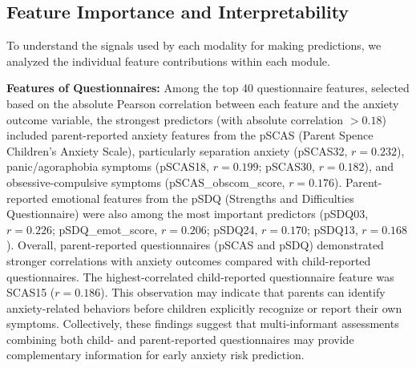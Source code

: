 \documentclass[10pt,letterpaper]{article}
\begin{document}
                                                                                                          \subsection*{Feature Importance and Interpretability}

                                                                                                                          To understand the signals used by each modality for making predictions, we analyzed the individual feature contributions within each module.

\textbf{Features of Questionnaires:} Among the top 40 questionnaire features, selected based on the absolute Pearson correlation between each feature and the anxiety outcome variable, the strongest predictors (with absolute correlation $> 0.18$) included parent-reported anxiety features from the pSCAS (Parent Spence Children’s Anxiety Scale), particularly separation anxiety (pSCAS32, $r = 0.232$), panic/agoraphobia symptoms (pSCAS18, $r = 0.199$; pSCAS30, $r = 0.182$), and obsessive-compulsive symptoms (pSCAS\_obscom\_score, $r = 0.176$). Parent-reported emotional features from the pSDQ (Strengths and Difficulties Questionnaire) were also among the most important predictors (pSDQ03, $r = 0.226$; pSDQ\_emot\_score, $r = 0.206$; pSDQ24, $r = 0.170$; pSDQ13, $r = 0.168$). Overall, parent-reported questionnaires (pSCAS and pSDQ) demonstrated stronger correlations with anxiety outcomes compared with child-reported questionnaires. The highest-correlated child-reported questionnaire feature was SCAS15 ($r = 0.186$). This observation may indicate that parents can identify anxiety-related behaviors before children explicitly recognize or report their own symptoms. Collectively, these findings suggest that multi-informant assessments combining both child- and parent-reported questionnaires may provide complementary information for early anxiety risk prediction.
\end{document}
